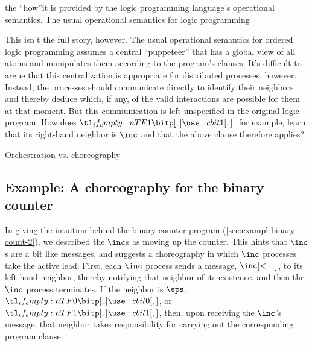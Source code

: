 the \enquote{how}it is provided by the logic programming language's operational semantics.
The usual operational semantics for logic programming 

This isn't the full story, however.
The usual operational semantics for ordered logic programming assumes a central \enquote{puppeteer} that has a global view of all atoms and manipulates them according to the program's clauses.
It's difficult to argue that this centralization is appropriate for distributed processes, however.
Instead, the processes should communicate directly to identify their neighbors and thereby deduce which, if any, of the valid interactions are possible for them at that moment.
But this communication is left unspecified in the original logic program.
How does $\bit{1}$, for example, learn that its right-hand neighbor is $\inc$ and that the above clause therefore applies?


Orchestration vs. choreography


\subsection{Example: A choreography for the binary counter}\label{sec:exampl-chor-binary}

In giving the intuition behind the binary counter program (\cref{sec:exampl-binary-count-2}), we described the $\inc$s %
as moving up the counter.
This hints that $\inc$s are a bit like messages, and suggests a choreography in which $\inc$ processes take the active lead:
First, each $\inc$ process sends a message, $\inc[<-]$, to its left-hand neighbor, thereby notifying that neighbor of its existence, and then the $\inc$ process terminates.
If the neighbor is $\eps$, $\bit{0}$, or $\bit{1}$, then, upon receiving the $\inc$'s message, that neighbor takes responsibility for carrying out the corresponding program clause.  

